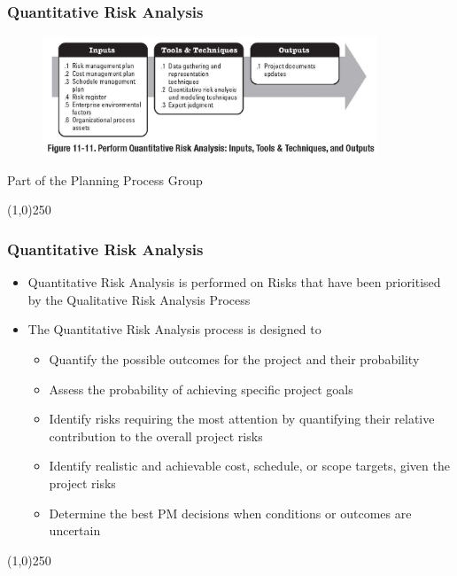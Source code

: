 \begin{frame}
\frametitle{Quantitative Risk Analysis}
\begin{figure}
	\centering
		\includegraphics[width = 10cm]{images/Fig11-11.jpg}
	\label{fig:11-11}
\end{figure}
Part of the Planning Process Group
\end{frame}\begin{center}\line(1,0){250}\end{center}






\begin{frame}
\frametitle{Quantitative Risk Analysis}
\begin{itemize}
	\item Quantitative Risk Analysis is performed on Risks that have been prioritised by the Qualitative Risk Analysis Process
	\item The Quantitative Risk Analysis process is designed to
	\begin{itemize}
		\item Quantify the possible outcomes for the project and their probability 
		\item Assess the probability of achieving specific project goals
		\item Identify risks requiring the most attention by quantifying their relative contribution to the overall project risks
		\item Identify realistic and achievable cost, schedule, or scope targets, given the project risks
		\item Determine the best PM decisions when conditions or outcomes are uncertain 
	\end{itemize}
\end{itemize}
\end{frame}\begin{center}\line(1,0){250}\end{center}






